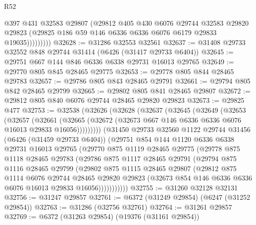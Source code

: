 \begin{lexlean}{R52}
\begin{coremodule}
                  @397
                  @431
                  @32583
                  @29807
                  (@29812
                    @405
                    @430
                    @6076
                    @29744
                    @32583
                    @29820
                    @29823
                    (@29825 @186 @59 @146 @6336 @6336 @6076 @6179 @29833 @19035)))))))))
@32628 := @31286 @32553 @32561
@32637 := @31408 @29733 @32552 @848 @29744 @31414 (@6426 (@31417 @29733 @6404))
@32645 := @29751 @667 @144 @846 @6336 @6338 @29731 @16013 @29765
@32649 := @29770 @805 @845 @28465 @29775
@32653 := @29778 @805 @844 @28465 @29783
@32657 := @29786 @805 @843 @28465 @29791
@32661 := @29794 @805 @842 @28465 @29799
@32665 := @29802 @805 @841 @28465 @29807
@32672 := @29812 @805 @840 @6076 @29744 @28465 @29820 @29823
@32673 := @29825 @477
@32753 := @32538
    (@32626
      (@32628
        (@32637
          (@32645
            (@32649
              (@32653
                (@32657
                  (@32661
                    (@32665
                      (@32672 (@32673 @667 @146 @6336 @6336 @6076 @16013 @29833 @16056)))))))))
        (@31450
          @29733
          @32560
          @1122
          @29744
          @31456
          (@6426 (@31459 @29733 @6404))
          (@29751
            @854
            @144
            @1120
            @6336
            @6338
            @29731
            @16013
            @29765
            (@29770
              @875
              @1119
              @28465
              @29775
              (@29778
                @875
                @1118
                @28465
                @29783
                (@29786
                  @875
                  @1117
                  @28465
                  @29791
                  (@29794
                    @875
                    @1116
                    @28465
                    @29799
                    (@29802
                      @875
                      @1115
                      @28465
                      @29807
                      (@29812
                        @875
                        @1114
                        @6076
                        @29744
                        @28465
                        @29820
                        @29823
                        (@32673 @854 @146 @6336 @6336 @6076 @16013 @29833 @16056)))))))))))
@32755 := @31260 @32128 @32131
@32756 := @31247 @29857
@32761 := @6372 (@31249 @29854) (@6247 (@31252 @29854))
@32763 := @31286 (@32756 @32761)
@32764 := @31261 @29857
@32769 := @6372 (@31263 @29854) (@19376 (@31161 @29854))

\end{coremodule}
\end{lexlean}
